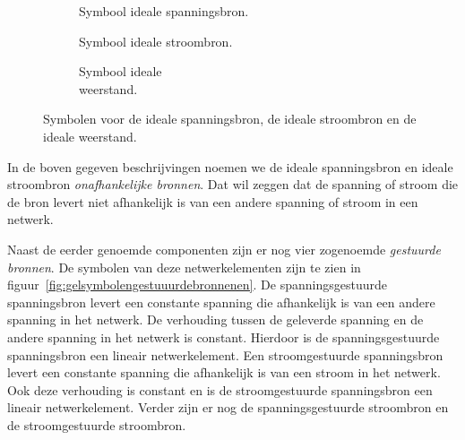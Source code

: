 \begin{figure}[!ht]
\centering
\begin{subfigure}[t]{0.30\textwidth}
\centering
{}
\caption{Symbool ideale spanningsbron.}
\end{subfigure}
\begin{subfigure}[t]{0.30\textwidth}
\centering
{}
\caption{Symbool ideale stroombron.}
\end{subfigure}
\begin{subfigure}[t]{0.30\textwidth}
\centering
{}
\caption{Symbool ideale\\ weerstand.}
\end{subfigure}
\caption{Symbolen voor de ideale spanningsbron, de ideale stroombron en de ideale weerstand.}
\label{fig:gelsymbolenbronnenenweerstand}
\end{figure}

In de boven gegeven beschrijvingen noemen we de ideale spanningsbron en ideale stroombron
\textsl{onafhankelijke bronnen}. Dat wil zeggen dat de spanning of stroom die de bron
levert niet afhankelijk is van een andere spanning of stroom in een netwerk.

Naast de eerder genoemde componenten zijn er nog vier zogenoemde \textsl{gestuurde bronnen}.
De symbolen van deze netwerkelementen zijn te zien in figuur~\ref{fig:gelsymbolengestuuurdebronnenen}.
De spanningsgestuurde spanningsbron levert een constante spanning die afhankelijk is van een
andere spanning in het netwerk. De verhouding tussen de geleverde spanning en de andere spanning
in het netwerk is constant. Hierdoor is de spanningsgestuurde spanningsbron een lineair netwerkelement.
Een stroomgestuurde spanningsbron levert een constante spanning die afhankelijk is van een stroom in
het netwerk. Ook deze verhouding is constant en is de stroomgestuurde spanningsbron een lineair
netwerkelement. Verder zijn er nog de spanningsgestuurde stroombron en de stroomgestuurde stroombron.

